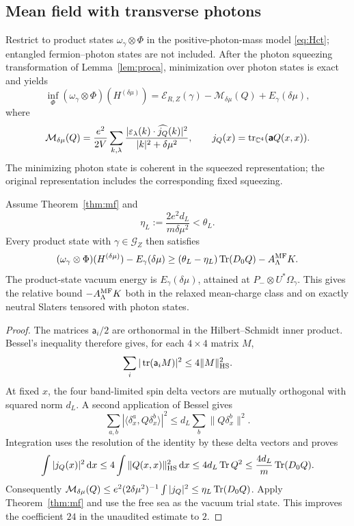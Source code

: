 \subsection{Mean field with transverse photons}
\label{subsec:mf-photons}

Restrict to product states $\omega_\gamma\otimes\Phi$ in the
positive-photon-mass model \eqref{eq:Hct}; entangled fermion--photon states
are not included.  After the photon squeezing transformation of
Lemma~\ref{lem:proca}, minimization over photon states is exact and yields
\begin{equation}
 \inf_\Phi(\omega_\gamma\otimes\Phi)(H^{(\delta\mu)})
 =\mathcal E_{R,Z}(\gamma)-\mathcal M_{\delta\mu}(Q)
       +E_\gamma(\delta\mu),
 \label{eq:mf-photon}
\end{equation}
where
\[
 \mathcal M_{\delta\mu}(Q)
 =\frac{e^2}{2V}\sum_{k,\lambda}
       \frac{|\varepsilon_\lambda(k)\cdot\widehat{j_Q}(k)|^2}
            {|k|^2+\delta\mu^2},
 \qquad
 j_Q(x)=\operatorname{tr}_{\mathbb C^4}(\boldsymbol{\mathsf a}Q(x,x)).
\]
The minimizing photon state is coherent in the squeezed representation;
the original representation includes the corresponding fixed squeezing.

\begin{proposition}
\label{prop:mf-heavy}
Assume Theorem~\ref{thm:mf} and
\[
 \eta_L:=\frac{2e^2d_L}{m\delta\mu^2}<\theta_L.
\]
Every product state with $\gamma\in\mathcal G_Z$ then satisfies
\[
 (\omega_\gamma\otimes\Phi)(H^{(\delta\mu)})-E_\gamma(\delta\mu)
 \ge(\theta_L-\eta_L)\operatorname{Tr}(D_0Q)-A^{\rm MF}_\Lambda K.
\]
The product-state vacuum energy is $E_\gamma(\delta\mu)$, attained at
$P_-\otimes U^*\Omega_\gamma$.  This gives the relative bound $-A^{\rm MF}_\Lambda K$
both in the relaxed mean-charge class and on exactly neutral Slaters
tensored with photon states.
\end{proposition}
\begin{proof}
The matrices $\mathsf a_i/2$ are orthonormal in the Hilbert--Schmidt inner
product.  Bessel's inequality therefore gives, for each $4\times4$ matrix $M$,
\[
 \sum_i|\operatorname{tr}(\mathsf a_iM)|^2\le4\|M\|_{\mathrm{HS}}^2.
\]
At fixed $x$, the four band-limited spin delta vectors are mutually
orthogonal with squared norm $d_L$.  A second application of Bessel gives
\[
 \sum_{a,b}|\langle\delta_x^a,Q\delta_x^b\rangle|^2
 \le d_L\sum_b\|Q\delta_x^b\|^2.
\]
Integration uses the resolution of the identity by these delta vectors and
proves
\[
 \int|j_Q(x)|^2\,\mathrm d x
 \le4\int\|Q(x,x)\|_{\mathrm{HS}}^2\,\mathrm d x
 \le4d_L\operatorname{Tr} Q^2
 \le\frac{4d_L}{m}\operatorname{Tr}(D_0Q).
\]
Consequently
$\mathcal M_{\delta\mu}(Q)\le
e^2(2\delta\mu^2)^{-1}\int|j_Q|^2\le\eta_L\operatorname{Tr}(D_0Q)$.
Apply Theorem~\ref{thm:mf} and use the free sea as the vacuum trial state.
This improves the coefficient $24$ in the unaudited estimate to $2$.
\end{proof}


